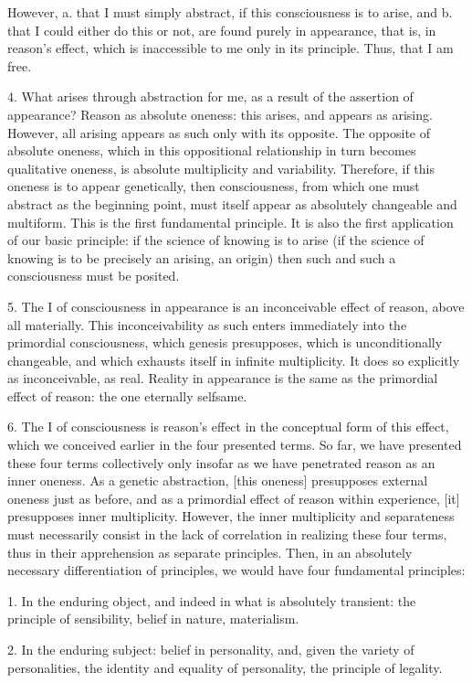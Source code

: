 However, a. that I must simply abstract,
if this consciousness is to arise,
and b. that I could either do this or not,
are found purely in appearance, that is,
in reason’s effect,
which is inaccessible to me
only in its principle.
Thus, that I am free.

4. What arises through abstraction for me,
as a result of the assertion of appearance?
Reason as absolute oneness:
this arises, and appears as arising.
However, all arising appears as such
only with its opposite.
The opposite of absolute oneness,
which in this oppositional relationship
in turn becomes qualitative oneness,
is absolute multiplicity and variability.
Therefore, if this oneness is to appear genetically,
then consciousness,
from which one must abstract as the beginning point,
must itself appear as absolutely changeable and multiform.
This is the first fundamental principle.
It is also the first application of our basic principle:
if the science of knowing is to arise
(if the science of knowing is to be
precisely an arising, an origin)
then such and such a consciousness must be posited.

5. The I of consciousness in appearance is
an inconceivable effect of reason,
above all materially.
This inconceivability as such
enters immediately into
the primordial consciousness,
which genesis presupposes,
which is unconditionally changeable,
and which exhausts itself in infinite multiplicity.
It does so explicitly as inconceivable, as real.
Reality in appearance is
the same as the primordial effect of reason:
the one eternally selfsame.

6. The I of consciousness is reason’s effect
in the conceptual form of this effect,
which we conceived earlier in the four presented terms.
So far, we have presented these four terms
collectively only insofar as we have
penetrated reason as an inner oneness.
As a genetic abstraction, [this oneness] presupposes
external oneness just as before,
and as a primordial effect of reason within experience,
[it] presupposes inner multiplicity.
However, the inner multiplicity and separateness must
necessarily consist in the lack of correlation
in realizing these four terms,
thus in their apprehension as separate principles.
Then, in an absolutely necessary differentiation of principles,
we would have four fundamental principles:

1. In the enduring object,
and indeed in what is absolutely transient:
the principle of sensibility, belief in nature, materialism.

2. In the enduring subject:
belief in personality,
and, given the variety of personalities,
the identity and equality of personality,
the principle of legality.

